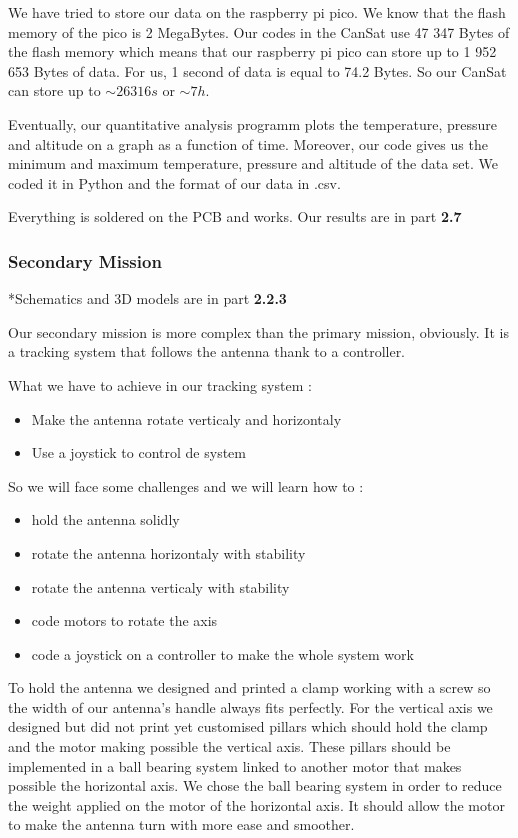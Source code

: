 \documentclass[]{article}
\begin{document}
We have tried to store our data on the raspberry pi pico. We know that the flash memory of the pico 
is 2 MegaBytes. Our codes in the CanSat use 47 347 Bytes of the flash memory which means that our raspberry pi pico
can store up to 1 952 653 Bytes of data. For us, 1 second of data is equal to 74.2 Bytes. So our CanSat
can store up to $\sim 26 316 s$ or $\sim 7 h$.

Eventually, our quantitative analysis programm plots the temperature, pressure and altitude on a graph
as a function of time. Moreover, our code gives us the minimum and maximum temperature, pressure and altitude of the 
data set. We coded it in Python and the format of our data in .csv.

Everything is soldered on the PCB and works. Our results are in part \textbf{2.7}

\subsubsection{Secondary Mission}

*Schematics and 3D models are in part \textbf{2.2.3}

Our secondary mission is more complex than the primary mission, obviously. It is a tracking system that
follows the antenna thank to a controller. 

What we have to achieve in our tracking system :
\begin{itemize}[left=4em]
    \item Make the antenna rotate verticaly and horizontaly 
    \item Use a joystick to control de system
\end{itemize}

So we will face some challenges and we will learn how to :
\begin{itemize}[left=4em]
    \item hold the antenna solidly
    \item rotate the antenna horizontaly with stability
    \item rotate the antenna verticaly with stability
    \item code motors to rotate the axis
    \item code a joystick on a controller to make the whole system work
\end{itemize}

To hold the antenna we designed and printed a clamp working with a screw so the width of our antenna's 
handle always fits perfectly. For the vertical axis we designed but did not print yet customised pillars 
which should hold the clamp and the motor making possible the vertical axis. These pillars should be
implemented in a ball bearing system linked to another motor that makes possible the horizontal axis. 
We chose the ball bearing system in order to reduce the weight applied on the motor of the horizontal axis.
It should allow the motor to make the antenna turn with more ease and smoother. 
\end{document}
